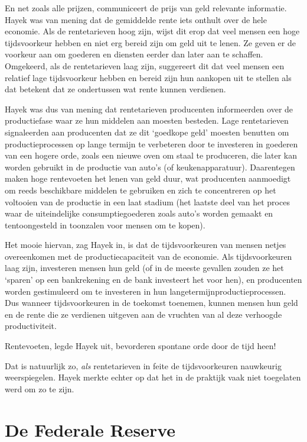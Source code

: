 \documentclass[
  a5paper,
  smalldemyvopaper,11pt,twoside,onecolumn,openright,extrafontsizes]{memoir}
\begin{document}
En net zoals alle prijzen, communiceert de prijs van geld relevante
informatie. Hayek was van mening dat de gemiddelde rente iets onthult
over de hele economie. Als de rentetarieven hoog zijn, wijst dit erop
dat veel mensen een hoge tijdsvoorkeur hebben en niet erg bereid zijn om
geld uit te lenen. Ze geven er de voorkeur aan om goederen en diensten
eerder dan later aan te schaffen. Omgekeerd, als de rentetarieven laag
zijn, suggereert dit dat veel mensen een relatief lage tijdsvoorkeur
hebben en bereid zijn hun aankopen uit te stellen als dat betekent dat
ze ondertussen wat rente kunnen verdienen.

Hayek was dus van mening dat rentetarieven producenten informeerden over
de productiefase waar ze hun middelen aan moesten besteden. Lage
rentetarieven signaleerden aan producenten dat ze dit `goedkope geld'
moesten benutten om productieprocessen op lange termijn te verbeteren
door te investeren in goederen van een hogere orde, zoals een nieuwe
oven om staal te produceren, die later kan worden gebruikt in de
productie van auto's (of keukenapparatuur). Daarentegen maken hoge
rentevoeten het lenen van geld duur, wat producenten aanmoedigt om reeds
beschikbare middelen te gebruiken en zich te concentreren op het
voltooien van de productie in een laat stadium (het laatste deel van het
proces waar de uiteindelijke consumptiegoederen zoals auto's worden
gemaakt en tentoongesteld in toonzalen voor mensen om te kopen).

Het mooie hiervan, zag Hayek in, is dat de tijdsvoorkeuren van mensen
netjes overeenkomen met de productiecapaciteit van de economie. Als
tijdsvoorkeuren laag zijn, investeren mensen hun geld (of in de meeste
gevallen zouden ze het `sparen' op een bankrekening en de bank
investeert het voor hen), en producenten worden gestimuleerd om te
investeren in hun langetermijnproductieprocessen. Dus wanneer
tijdsvoorkeuren in de toekomst toenemen, kunnen mensen hun geld en de
rente die ze verdienen uitgeven aan de vruchten van al deze verhoogde
productiviteit.

Rentevoeten, legde Hayek uit, bevorderen spontane orde door de tijd
heen!

Dat is natuurlijk zo, \emph{als} rentetarieven in feite de
tijdsvoorkeuren nauwkeurig weerspiegelen. Hayek merkte echter op dat het
in de praktijk vaak niet toegelaten werd om zo te zijn.

\section{De Federale Reserve}\label{de-federale-reserve}
\end{document}
